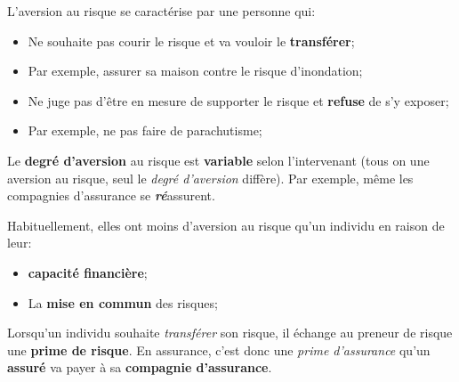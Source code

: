 \documentclass[10pt, french]{article}
\begin{document}
\begin{multicols*}{3}
\begin{definitionNOHFILL}[Aversion]
L'aversion au risque se caractérise par une personne qui:
\begin{itemize}
	\item	Ne souhaite pas courir le risque et va vouloir le \textbf{transférer};
	\item[]	Par exemple, assurer sa maison contre le risque d'inondation;
	\item	Ne juge pas d'être en mesure de supporter le risque et \textbf{refuse} de s'y exposer;
	\item[]	Par exemple, ne pas faire de parachutisme;
\end{itemize}
	
Le \textbf{degré d'aversion} au risque est \textbf{variable} selon l'intervenant (tous on une aversion au risque, seul le \textit{degré d'aversion} diffère). Par exemple, même les compagnies d'assurance se \textit{\textbf{ré}}assurent. 

Habituellement, elles ont moins d'aversion au risque qu'un individu en raison de leur:
\begin{itemize}
	\item	\textbf{capacité financière};
	\item	La \textbf{mise en commun} des risques;
\end{itemize} 

Lorsqu'un individu souhaite \textit{transférer} son risque, il échange au preneur de risque une \textbf{prime de risque}. En assurance, c'est donc une \textit{prime d'assurance} qu'un \textbf{assuré} va payer à sa \textbf{compagnie d'assurance}.
\end{definitionNOHFILL}


\end{multicols*}
\end{document}
